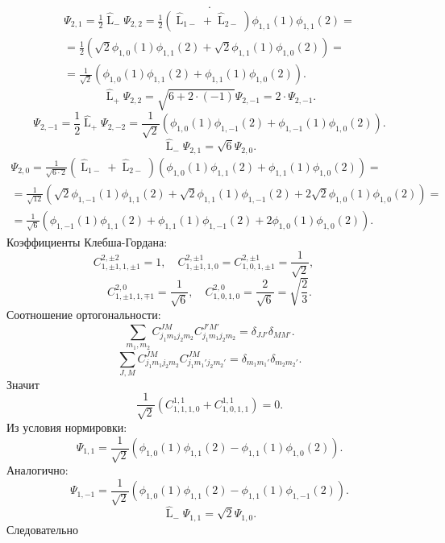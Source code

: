 \documentclass[a4paper]{article}
\begin{document}
\begin{sol}
\begin{enumerate}
\[.\] 
\begin{multline*}
\Psi_{2,1}= \frac{1}{2} \widehat{\operatorname{L}}_-
\Psi_{2,2} = \frac{1}{2} \left( 
\widehat{\operatorname{L}}_{1-}+\widehat{\operatorname{L}}_{2-}\right) 
\phi_{1,1} (1) \phi_{1,1}(2)=\\=
\frac{1}{2} \left( \sqrt{2} \phi_{1,0}
(1) \phi_{1,1} (2) +\sqrt{2}  \phi_{1,1}(1)
\phi_{1,0} (2)\right) =\\=\frac{1}{\sqrt{2} }
\left( \phi_{1,0} (1) \phi_{1,1}(2)
+ \phi_{1,1}(1) \phi_{1,0} (2)\right) 
.\end{multline*} 
\[
\widehat{\operatorname{L}}_+ \Psi_{2,2}
= \sqrt{ 6+2\cdot (-1)} \Psi_{2,-1}=
2\cdot  \Psi_{2,-1}
.\] 
\[
\Psi_{2,-1}= \frac{1}{2} \widehat{\operatorname{L}}_+
\Psi_{2,-2}= \frac{1}{\sqrt{2} }
\left( \phi_{1,0}(1)\phi_{1,-1}(2)+
\phi_{1,-1}(1)\phi_{1,0}(2)\right) 
.\] 
\[
\widehat{\operatorname{L}}_- \Psi_{2,1}=
\sqrt{6} \Psi_{2,0}
.\] 
\begin{multline*}
\Psi_{2,0}= \frac{1}{\sqrt{6\cdot 2} }
\left( \widehat{\operatorname{L}}_{1-}+
\widehat{\operatorname{L}}_{2-}\right) 
\left( \phi_{1,0}(1)\phi_{1,1}(2)+
\phi_{1,1}(1) \phi_{1,0}(2)\right) =\\=
\frac{1}{\sqrt{12} } \left( 
\sqrt{2} \phi_{1,-1}(1) \phi_{1,1}(2)
+\sqrt{2}  \phi_{1,1} (1) \phi_{1,-1}(2)+
2\sqrt{2} \phi_{1,0}(1)\phi_{1,0}(2)\right) 
=\\= \frac{1}{\sqrt{6} } \left( 
\phi_{1,-1} (1)\phi_{1,1}(2)+\phi_{1,1}(1)
\phi_{1,-1}(2)+2\phi_{1,0}(1)\phi_{1,0}(2)\right) 
.\end{multline*} 
Коэффициенты Клебша-Гордана:
\[
C_{1,\pm 1,1,\pm 1}^{2,\pm 2}=1,\quad
C_{1,\pm 1,1,0}^{2,\pm 1}=C_{1,0,1,\pm 1}^{
2,\pm 1}= \frac{1}{\sqrt{2} },\quad
\] 
\[
C_{1,\pm 1,1,\mp 1}^{2,0}= \frac{1}{\sqrt{6} },\quad
C_{1,0,1,0}^{2,0}=\frac{2}{\sqrt{6} }=\sqrt{\frac{2}{3}} 
.\] 
Соотношение ортогональности:
\[
\sum_{m_1,m_2}^{} C_{j_1 m_1 j_2 m_2}^{
JM} C_{j_1 m_1 j_2 m_2}^{J' M'}=
\delta_{JJ'}\delta_{MM'}
.\] 
\[
\sum_{J,M}^{} C_{j_1 m_1 j_2 m_2}^{J M}
C_{j_1 m_1' j_2 m_2'}^{JM}=
\delta_{m_1 m_1'}\delta_{m_2 m_2'}
.\] 
Значит
\[
	\frac{1}{\sqrt{2} }\left( C_{1,1,1,0}^{1,1}+C_{1,0,1,1}^{1,1} \right) =0
.\] 
Из условия нормировки:
\[
\Psi_{1,1}= \frac{1}{\sqrt{2} }
\left( \phi_{1,0} (1) \phi_{1,1}(2) -\phi_{1,1}
(1) \phi_{1,0}(2)\right) 
.\] 
Аналогично:
\[
\Psi_{1,-1}= \frac{1}{\sqrt{2} }
\left( \phi_{1,0}(1) \phi_{1,1}(2)-\phi_{1,1}
(1) \phi_{1,-1}(2)\right) 
.\] 
\[
\widehat{\operatorname{L}}_{-} \Psi_{1,1}=
\sqrt{2}  \Psi_{1,0}
.\] 
Следовательно
\begin{multline*}

\end{multline*}
\end{enumerate}
\end{sol}
\end{document}

